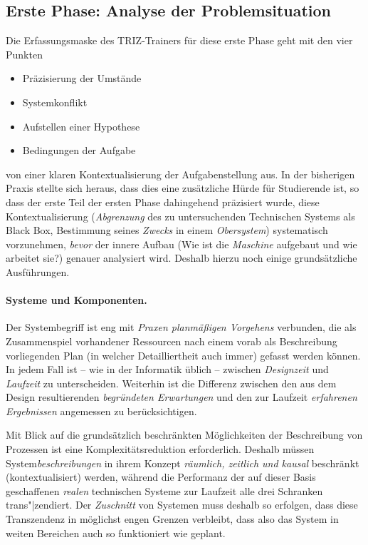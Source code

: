 \documentclass[11pt,a4paper]{article}
\begin{document}
\subsection{Erste Phase: Analyse der Problemsituation}

Die Erfassungsmaske des TRIZ-Trainers für diese erste Phase geht mit den vier
Punkten
\begin{itemize}[noitemsep]
\item Präzisierung der Umstände 
\item Systemkonflikt
\item Aufstellen einer Hypothese 
\item Bedingungen der Aufgabe 
\end{itemize}
von einer klaren Kontextualisierung der Aufgabenstellung aus.  In der
bisherigen Praxis stellte sich heraus, dass dies eine zusätzliche Hürde für
Studierende ist, so dass der erste Teil der ersten Phase dahingehend
präzisiert wurde, diese Kontextualisierung (\emph{Abgrenzung} des zu
untersuchenden Technischen Systems als Black Box, Bestimmung seines
\emph{Zwecks} in einem \emph{Obersystem}) systematisch vorzunehmen,
\emph{bevor} der innere Aufbau (Wie ist die \emph{Maschine} aufgebaut und wie
arbeitet sie?) genauer analysiert wird.  Deshalb hierzu noch einige
grundsätzliche Ausführungen.

\paragraph{Systeme und Komponenten.} 
Der Systembegriff ist eng mit \emph{Praxen planmäßigen Vorgehens} verbunden,
die als Zusammenspiel vorhandener Ressourcen nach einem vorab als Beschreibung
vorliegenden Plan (in welcher Detailliertheit auch immer) gefasst werden
können.  In jedem Fall ist -- wie in der Informatik üblich -- zwischen
\emph{Designzeit} und \emph{Laufzeit} zu unterscheiden. Weiterhin ist die
Differenz zwischen den aus dem Design resultierenden \emph{begründeten
  Erwartungen} und den zur Laufzeit \emph{erfahrenen Ergebnissen} angemessen
zu berücksichtigen.

Mit Blick auf die grundsätzlich beschränkten Möglichkeiten der Beschreibung
von Prozessen ist eine Komplexitätsreduktion erforderlich. Deshalb müssen
System\emph{beschreibungen} in ihrem Konzept \emph{räumlich, zeitlich und
  kausal} beschränkt (kontextualisiert) werden, während die Performanz der auf
dieser Basis geschaffenen \emph{realen} technischen Systeme zur Laufzeit alle
drei Schranken trans"|zendiert. Der \emph{Zuschnitt} von Systemen muss deshalb
so erfolgen, dass diese Transzendenz in möglichst engen Grenzen verbleibt,
dass also das System in weiten Bereichen auch so funktioniert wie geplant.
\end{document}
